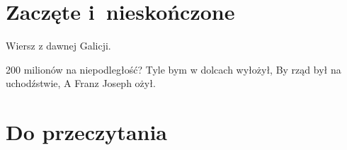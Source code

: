 \documentclass[a4paper,11pt]{article}
\begin{document}
\newpage
\section{Zaczęte i~nieskończone}

\vspace{\spaceTwo}








Wiersz z dawnej Galicji.

200 milionów na niepodległość? Tyle bym w dolcach wyłożył, By rząd był
na uchodźstwie, A Franz Joseph ożył.





\newpage
\section{Do przeczytania}

\vspace{\spaceTwo}
\end{document}
